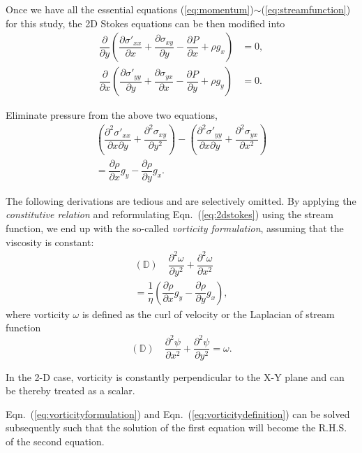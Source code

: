 \documentclass[12pt]{article}
\numberwithin{figure}{section}  %
\numberwithin{equation}{section}  %
\begin{document}
\begin{multicols}{2}
Once we have all the essential equations (\ref{eq:momentum})$\sim$(\ref{eq:streamfunction}) for this study, the 2D Stokes equations can be then modified into
\begin{align*}
    \dfrac{\partial}{\partial{y}}\left(\dfrac{\partial\sigma'_{xx}}{\partial{x}} + \dfrac{\partial\sigma_{xy}}{\partial{y}} - \dfrac{\partial{P}}{\partial{x}} + \rho{g}_x\right) &= 0, \\
    \dfrac{\partial}{\partial{x}}\left(\dfrac{\partial\sigma'_{yy}}{\partial{y}} + \dfrac{\partial\sigma_{yx}}{\partial{x}} - \dfrac{\partial{P}}{\partial{y}} + \rho{g}_y\right) &= 0.
\end{align*}

Eliminate pressure from the above two equations,
\begin{multline}\label{eq:2dstokes}
    \left(\dfrac{\partial^2\sigma'_{xx}}{\partial{x}\partial{y}}+\dfrac{\partial^2\sigma_{xy}}{\partial{y}^2}\right) - \left(\dfrac{\partial^2\sigma'_{yy}}{\partial{x}\partial{y}}+\dfrac{\partial^2\sigma_{yx}}{\partial{x}^2}\right) \\
    = \dfrac{\partial\rho}{\partial{x}}g_y - \dfrac{\partial\rho}{\partial{y}}g_x.
\end{multline}

The following derivations are tedious and are selectively omitted. By applying the \emph{constitutive relation} and reformulating Eqn.\ (\ref{eq:2dstokes}) using the stream function, we end up with the so-called \emph{vorticity formulation}, assuming that the viscosity is constant:
\begin{multline}\label{eq:vorticityformulation}
    (\mathbb{D})\quad\dfrac{\partial^2\omega}{\partial{y}^2} + \dfrac{\partial^2\omega}{\partial{x}^2} \\
    = \dfrac{1}{\eta}\left(\dfrac{\partial\rho}{\partial{x}}g_y - \dfrac{\partial\rho}{\partial{y}}g_x\right),
\end{multline}
where vorticity $\omega$ is defined as the curl of velocity or the Laplacian of stream function
\begin{equation}\label{eq:vorticitydefinition}
    (\mathbb{D})\quad\dfrac{\partial^2\psi}{\partial{x}^2} + \dfrac{\partial^2\psi}{\partial{y}^2} = \omega.
\end{equation}

In the 2-D case, vorticity is constantly perpendicular to the X-Y plane and can be thereby treated as a scalar.

Eqn.\ (\ref{eq:vorticityformulation}) and Eqn.\ (\ref{eq:vorticitydefinition}) can be solved subsequently such that the solution of the first equation will become the R.H.S. of the second equation.


\end{multicols}
\end{document}
